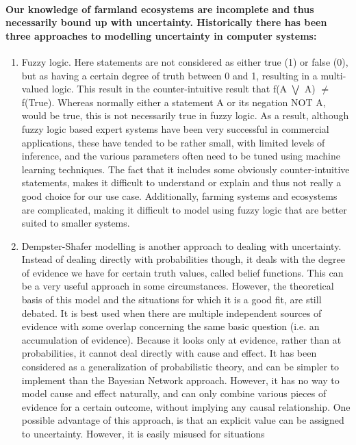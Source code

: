 \paragraph{Our knowledge of farmland ecosystems are incomplete and thus necessarily
bound up with uncertainty. Historically there has been three approaches
to modelling uncertainty in computer systems:}
\begin{enumerate}
\item Fuzzy logic. Here statements are not considered as either true (1)
or false (0), but as having a certain degree of truth between 0 and
1, resulting in a multi-valued logic. This result in the counter-intuitive
result that f(A \ensuremath{\bigvee} \textlnot{} A) \ensuremath{\neq}
f(True). Whereas normally either a statement A or its negation NOT
A, would be true, this is not necessarily true in fuzzy logic. As
a result, although fuzzy logic based expert systems have been very
successful in commercial applications, these have tended to be rather
small, with limited levels of inference, and the various parameters
often need to be tuned using machine learning techniques. The fact
that it includes some obviously counter-intuitive statements, makes
it difficult to understand or explain and thus not really a good choice
for our use case. Additionally, farming systems and ecosystems are
complicated, making it difficult to model using fuzzy logic that are
better suited to smaller systems.
\item Dempster-Shafer modelling is another approach to dealing with uncertainty.
Instead of dealing directly with probabilities though, it deals with
the degree of evidence we have for certain truth values, called belief
functions. This can be a very useful approach in some circumstances.
However, the theoretical basis of this model and the situations for
which it is a good fit, are still debated. It is best used when there
are multiple independent sources of evidence with some overlap concerning
the same basic question (i.e. an accumulation of evidence). Because
it looks only at evidence, rather than at probabilities, it cannot
deal directly with cause and effect. It has been considered as a generalization
of probabilistic theory, and can be simpler to implement than the
Bayesian Network approach. However, it has no way to model cause and
effect naturally, and can only combine various pieces of evidence
for a certain outcome, without implying any causal relationship. One
possible advantage of this approach, is that an explicit value can
be assigned to uncertainty. However, it is easily misused for situations

\end{enumerate}
